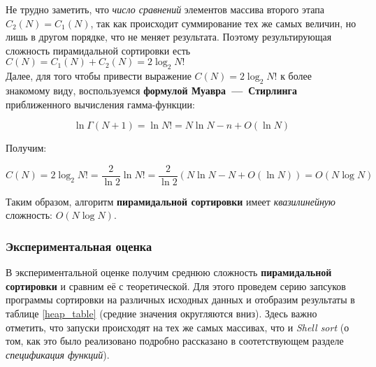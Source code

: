 \documentclass[a4paper,12pt,titlepage,finall]{article}
\begin{document}
Не трудно заметить, что \textit{число сравнений} элементов массива второго этапа $C_2(N) = C_1(N)$, так как происходит суммирование тех же самых величин, но лишь в другом порядке, что не меняет результата. Поэтому результирующая сложность пирамидальной сортировки есть $C(N) = C_1(N) + C_2(N) = 2\log_{2}{N!}$
\\

Далее, для того чтобы привести выражение $C(N) = 2\log_{2}{N!}$ к более знакомому виду, воспользуемся \textbf{формулой Муавра~—~Стирлинга} приближенного вычисления гамма-функции:

\begin{equation}\label{Muavr_1}
\displaystyle \ln \Gamma (N+1)=\ln N!=N\ln N-n+O(\ln N)
\end{equation}

Получим:

\begin{equation}\label{Heap_result_K}
C(N) = 2\log_{2}{N!} = \frac{2}{\ln{2}}\ln{N!} = \frac{2}{\ln{2}}( N\ln N-N+O(\ln N)) = O(N\log N)
\end{equation}

Таким образом, алгоритм \textbf{пирамидальной сортировки} имеет \textit{квазилинейную} сложность: $O(N\log N)$.

\subsubsection*{Экспериментальная оценка} 

В экспериментальной оценке получим среднюю сложность \textbf{пирамидальной сортировки} и сравним её с теоретической. Для этого проведем серию запсуков программы сортировки на различных исходных данных и отобразим результаты в таблице \ref{heap_table} (средние значения округляются вниз). Здесь важно отметить, что запуски происходят на тех же самых массивах, что и \textit{Shell sort} (о том, как это было реализовано подробно рассказано в соотетствующем разделе \textit{спецификация функций}).
\end{document}
